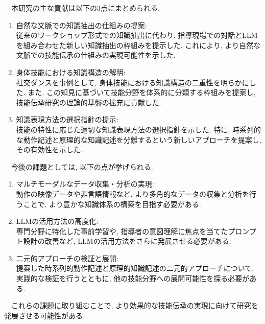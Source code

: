 　本研究の主な貢献は以下の3点にまとめられる.\\
\begin{enumerate}
    \item 自然な文脈での知識抽出の仕組みの提案:\\
    従来のワークショップ形式での知識抽出に代わり, 指導現場での対話とLLMを組み合わせた新しい知識抽出の枠組みを提示した. これにより, より自然な文脈での技能伝承の仕組みの実現可能性を示した.

    \item 身体技能における知識構造の解明:\\
    社交ダンスを事例として, 身体技能における知識構造の二重性を明らかにした. また, この知見に基づいて技能分野を体系的に分類する枠組みを提案し, 技能伝承研究の理論的基盤の拡充に貢献した.

    \item 知識表現方法の選択指針の提示:\\
    技能の特性に応じた適切な知識表現方法の選択指針を示した. 特に, 時系列的な動作記述と原理的な知識記述を分離するという新しいアプローチを提案し, その有効性を示した.
\end{enumerate}
　今後の課題としては, 以下の点が挙げられる.\\
\begin{enumerate}
    \item マルチモーダルなデータ収集・分析の実現:\\
    動作の映像データや非言語情報など, より多角的なデータの収集と分析を行うことで, より豊かな知識体系の構築を目指す必要がある.

    \item LLMの活用方法の高度化:\\
    専門分野に特化した事前学習や, 指導者の意図理解に焦点を当てたプロンプト設計の改善など, LLMの活用方法をさらに発展させる必要がある.

    \item 二元的アプローチの検証と展開:\\
    提案した時系列的動作記述と原理的知識記述の二元的アプローチについて, 実践的な検証を行うとともに, 他の技能分野への展開可能性を探る必要がある.
\end{enumerate}
　これらの課題に取り組むことで, より効果的な技能伝承の実現に向けて研究を発展させる可能性がある.\\
